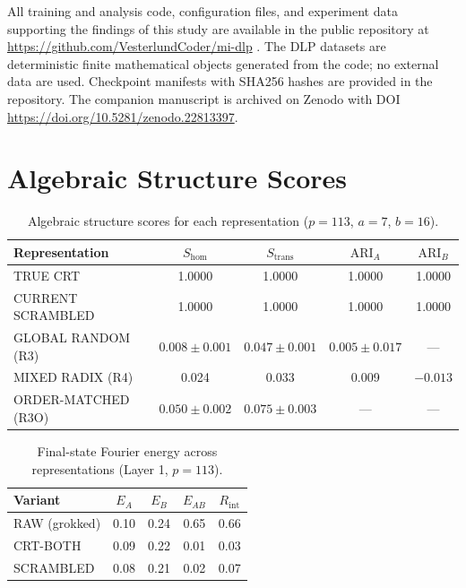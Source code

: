 \documentclass[11pt,a4paper]{article}
\theoremstyle{definition}
\theoremstyle{remark}
\newcommand{\Shom}{S_{\mathrm{hom}}}
\newcommand{\Strans}{S_{\mathrm{trans}}}
\newcommand{\ARI}{\mathrm{ARI}}
\newcommand{\EAB}{E_{AB}}
\newcommand{\EA}{E_A}
\newcommand{\EB}{E_B}
\newcommand{\Rint}{R_{\mathrm{int}}}
\begin{document}
All training and analysis code, configuration files, and experiment data supporting the findings of this study are available in the public repository at \url{https://github.com/VesterlundCoder/mi-dlp} \citep{vesterlund2026mi_dlp_repo}. The DLP datasets are deterministic finite mathematical objects generated from the code; no external data are used. Checkpoint manifests with SHA256 hashes are provided in the repository. The companion manuscript \citep{vesterlund2026grokking} is archived on Zenodo with DOI \url{https://doi.org/10.5281/zenodo.22813397}.




\appendix
\section{Algebraic Structure Scores}
\label{app:tables}

\begin{table}[h]
\centering
\caption{Algebraic structure scores for each representation ($p = 113$, $a = 7$, $b = 16$).}
\label{tab:structure}
\begin{tabular}{lcccc}
\toprule
Representation & $\Shom$ & $\Strans$ & $\ARI_A$ & $\ARI_B$ \\
\midrule
TRUE CRT & 1.0000 & 1.0000 & 1.0000 & 1.0000 \\
CURRENT SCRAMBLED & 1.0000 & 1.0000 & 1.0000 & 1.0000 \\
GLOBAL RANDOM (R3) & $0.008 \pm 0.001$ & $0.047 \pm 0.001$ & $0.005 \pm 0.017$ & --- \\
MIXED RADIX (R4) & 0.024 & 0.033 & 0.009 & $-0.013$ \\
ORDER-MATCHED (R3O) & $0.050 \pm 0.002$ & $0.075 \pm 0.003$ & --- & --- \\
\bottomrule
\end{tabular}
\end{table}

\begin{table}[h]
\centering
\caption{Final-state Fourier energy across representations (Layer 1, $p=113$).}
\label{tab:fourier_final}
\begin{tabular}{lcccc}
\toprule
Variant & $\EA$ & $\EB$ & $\EAB$ & $\Rint$ \\
\midrule
RAW (grokked) & 0.10 & 0.24 & 0.65 & 0.66 \\
CRT-BOTH & 0.09 & 0.22 & 0.01 & 0.03 \\
SCRAMBLED & 0.08 & 0.21 & 0.02 & 0.07 \\
\bottomrule
\end{tabular}
\end{table}
\end{document}
